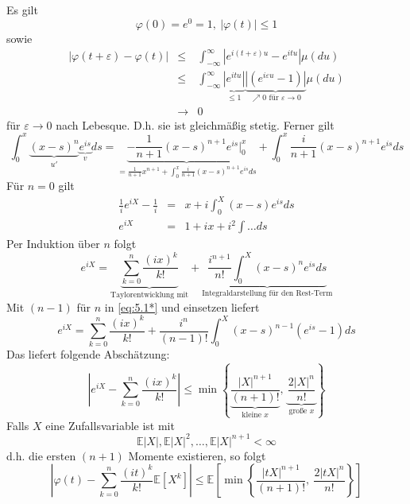 \documentclass[10pt,a4paper]{report}
\numberwithin{equation}{section}
\numberwithin{figure}{section}
\theoremstyle{plain}
\theoremstyle{definition}
\theoremstyle{remark}
\theoremstyle{plain}
\newcommand{\1}{ \mathbb{1} } %
\begin{document}
Es gilt
\[
\varphi\left(0\right)=e^{0}=1,\ \left|\varphi\left(t\right)\right|\leq1
\]
sowie 
\begin{eqnarray*}
  \left|\varphi\left(t+\varepsilon\right)-\varphi\left(t\right)\right| & \leq & \int_{-\infty}^{\infty}\left|e^{i\left(t+\varepsilon\right)u}-e^{itu}\right|\mu\left(du\right)\\
  & \leq & \int_{-\infty}^{\infty}\underset{\leq1}{\underbrace{\left|e^{itu}\right|}}\underset{\nearrow0\text{ für }\varepsilon\to0}{\underbrace{\left|\left(e^{i\varepsilon u}-1\right)\right|}}\mu\left(du\right)\\
  & \to & 0
\end{eqnarray*}
für $\varepsilon\to0$ nach Lebesque. D.h. sie ist gleichmäßig stetig.
Ferner gilt 
\begin{equation}
  \int_{0}^{x}\underset{u'}{\underbrace{\left(x-s\right)^{n}}}\underset{v}{\underbrace{e^{is}}}ds=\underset{=\frac{1}{n+1}x^{n+1}+\int_{0}^{x}\frac{i}{n+1}\left(x-s\right)^{n+1}e^{is}ds}{\underbrace{-\frac{1}{n+1}\left(x-s\right)^{n+1}e^{is}|_{0}^{x}}}+\int_{0}^{x}\frac{i}{n+1}\left(x-s\right)^{n+1}e^{is}ds\label{eq:5.1*}
\end{equation}
Für $n=0$ gilt
\begin{eqnarray*}
  \frac{1}{i}e^{iX}-\frac{1}{i} & = & x+i\int_{0}^{X}\left(x-s\right)e^{is}ds\\
  e^{iX} & = & 1+ix+i^{2}\int\ldots ds
\end{eqnarray*}
Per Induktion über $n$ folgt
\[
e^{iX}=\underset{\mbox{Taylorentwicklung mit}}{\underbrace{\sum_{k=0}^{n}\frac{\left(ix\right)^{k}}{k!}}}+\underset{\mbox{Integraldarstellung für den Rest-Term}}{\underbrace{\frac{i^{n+1}}{n!}\int_{0}^{X}\left(x-s\right)^{n}e^{is}ds}}
\]
Mit $\left(n-1\right)$ für $n$ in \ref{eq:5.1*} und einsetzen liefert
\[
e^{iX}=\sum_{k=0}^{n}\frac{\left(ix\right)^{k}}{k!}+\frac{i^{n}}{\left(n-1\right)!}\int_{0}^{X}\left(x-s\right)^{n-1}\left(e^{is}-1\right)ds
\]
Das liefert folgende Abschätzung:
\[
\left|e^{iX}-\sum_{k=0}^{n}\frac{\left(ix\right)^{k}}{k!}\right|\leq\min\left\{ \underset{\mbox{kleine }x}{\underbrace{\frac{\left|X\right|^{n+1}}{\left(n+1\right)!}}},\ \underset{\mbox{große }x}{\underbrace{\frac{2\left|X\right|^{n}}{n!}}}\right\} 
\]
Falls $X$ eine Zufallsvariable ist mit 
\[
\mathbb{E}\left|X\right|,\mathbb{E}\left|X\right|^{2},\ldots,\mathbb{E}\left|X\right|^{n+1}<\infty
\]
d.h. die ersten $\left(n+1\right)$ Momente existieren, so folgt
\[
\left|\varphi\left(t\right)-\sum_{k=0}^{n}\frac{\left(it\right)^{k}}{k!}\mathbb{E}\left[X^{k}\right]\right|\leq\mathbb{E}\left[\min\left\{ \frac{\left|tX\right|^{n+1}}{\left(n+1\right)!},\ \frac{2\left|tX\right|^{n}}{n!}\right\} \right]
\]
\end{document}
